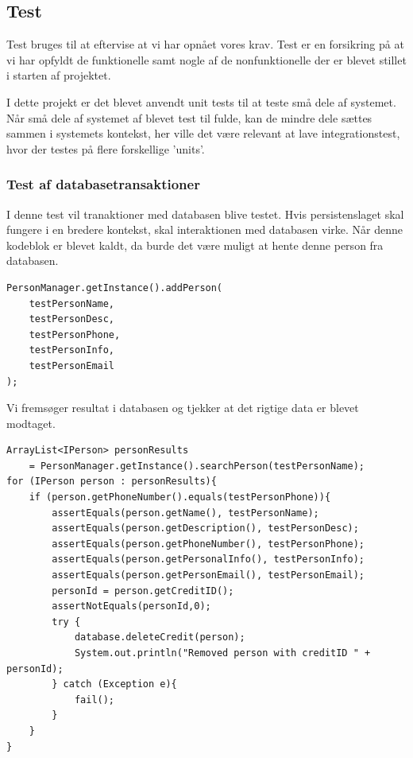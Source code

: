\newpage
\subsection{Test}

Test bruges til at eftervise at vi har opnået vores krav. Test er en forsikring
på at vi har opfyldt de funktionelle samt nogle af de nonfunktionelle der er
blevet stillet i starten af projektet.

I dette projekt er det blevet anvendt unit tests til at teste små dele af
systemet. Når små dele af systemet af blevet test til fulde, kan de mindre dele
sættes sammen i systemets kontekst, her ville det være relevant at lave
integrationstest, hvor der testes på flere forskellige 'units'.

\subsubsection{Test af databasetransaktioner}%
\label{ssub:test_af_database_transaktioner}

I denne test vil tranaktioner med databasen blive testet. Hvis
persistenslaget skal fungere i en bredere kontekst, skal interaktionen med
databasen virke. Når denne kodeblok er blevet kaldt, da burde det være muligt at
hente denne person fra databasen.

\begin{lstlisting}
PersonManager.getInstance().addPerson(
    testPersonName,
    testPersonDesc,
    testPersonPhone,
    testPersonInfo,
    testPersonEmail
);
\end{lstlisting}

Vi fremsøger resultat i databasen og tjekker at det rigtige data er blevet
modtaget.

\begin{lstlisting}
ArrayList<IPerson> personResults 
    = PersonManager.getInstance().searchPerson(testPersonName);
for (IPerson person : personResults){
    if (person.getPhoneNumber().equals(testPersonPhone)){
        assertEquals(person.getName(), testPersonName);
        assertEquals(person.getDescription(), testPersonDesc);
        assertEquals(person.getPhoneNumber(), testPersonPhone);
        assertEquals(person.getPersonalInfo(), testPersonInfo);
        assertEquals(person.getPersonEmail(), testPersonEmail);
        personId = person.getCreditID();
        assertNotEquals(personId,0);
        try {
            database.deleteCredit(person);
            System.out.println("Removed person with creditID " + personId);
        } catch (Exception e){
            fail();
        }
    }
}
\end{lstlisting}

